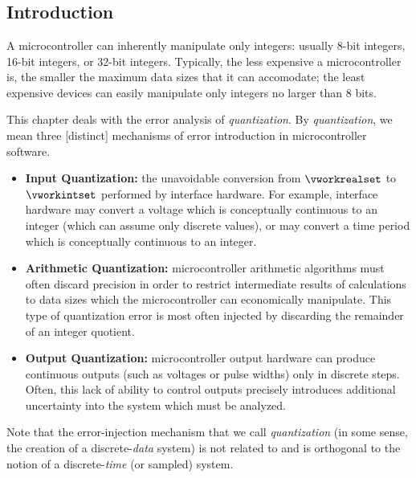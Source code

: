 
\chapter{\cquazerolongtitle{}}

\label{cqua0}

\section{Introduction}

A microcontroller can inherently manipulate only integers:  usually 8-bit
integers, 16-bit integers, or 32-bit integers.  Typically, the less
expensive a microcontroller is, the smaller the maximum data sizes that
it can accomodate; the least expensive devices can easily manipulate
only integers no larger than 8 bits.

This chapter deals with the error analysis of \emph{quantization}.  By
\emph{quantization}, we mean three [distinct] mechanisms of error introduction
in microcontroller software.

\begin{itemize}
\item \textbf{Input Quantization:} the unavoidable conversion from
      $\vworkrealset$ to $\vworkintset$ performed by interface hardware.
      For example, interface hardware may convert a voltage which is
      conceptually continuous to an integer (which can assume only discrete
      values), or may convert a time period which is conceptually
      continuous to an integer.
\item \textbf{Arithmetic Quantization:} microcontroller arithmetic algorithms
      must often discard precision in order to restrict intermediate results of
      calculations to data sizes which the microcontroller can economically
      manipulate.  This type of quantization error is most often injected
      by discarding the remainder of an integer quotient.
\item \textbf{Output Quantization:} microcontroller output hardware can
      produce continuous outputs (such as voltages or pulse widths)
      only in discrete steps.  Often, this lack of ability to control
      outputs precisely introduces additional uncertainty into the
      system which must be analyzed.
\end{itemize}

Note that the error-injection mechanism that we call \emph{quantization}
(in some sense, the creation of a discrete-\emph{data} system)
is not related to and is orthogonal to the notion of a
discrete-\emph{time} (or sampled) system.


